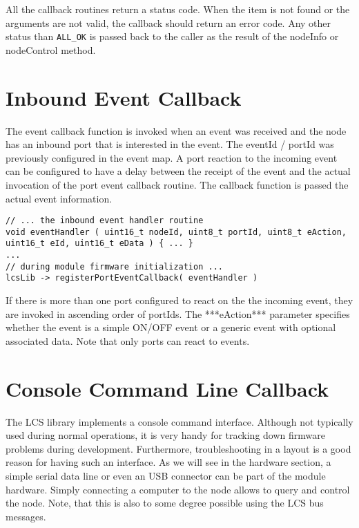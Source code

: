 All the callback routines return a status code. When the item is not found or the arguments are not valid, the callback should return an error code. Any other status than \texttt{ALL\_OK} is passed back to the caller as the result of the nodeInfo or nodeControl method.

\section{Inbound Event Callback}

The event callback function is invoked when an event was received and the node has an inbound port that is interested in the event. The eventId / portId was previously configured in the event map. A port reaction to the incoming event can be configured to have a delay between the receipt of the event and the actual invocation of the port event callback routine. The callback function is passed the actual event information.

\lstset{style=codesnippetstyle}
\begin{minipage}{\textwidth}
\begin{lstlisting}
// ... the inbound event handler routine
void eventHandler ( uint16_t nodeId, uint8_t portId, uint8_t eAction, uint16_t eId, uint16_t eData ) { ... }
...
// during module firmware initialization ...
lcsLib -> registerPortEventCallback( eventHandler )
\end{lstlisting}
\end{minipage}

If there is more than one port configured to react on the the incoming event, they are invoked in ascending order of portIds. The ***eAction*** parameter specifies whether the event is a simple ON/OFF event or a generic event with optional associated data. Note that only ports can react to events.

\section{Console Command Line Callback}

The LCS library implements a console command interface. Although not typically used during normal operations, it is very handy for tracking down firmware problems during development. Furthermore, troubleshooting in a layout is a good reason for having such an interface. As we will see in the hardware section, a simple serial data line or even an USB connector can be part of the module hardware. Simply connecting a computer to the node allows to query and control the node. Note, that this is also to some degree possible using the LCS bus messages.

